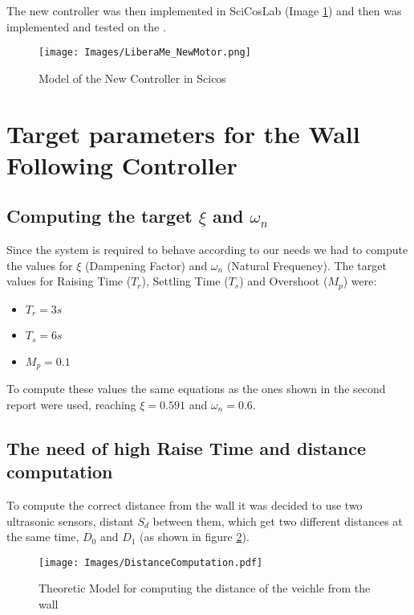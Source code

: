   The new controller was then implemented in SciCosLab (Image
  \ref{img:LiberaMeC}) and then was implemented and tested on the \nxt{}.
  
  \begin{figure}[h!]
    \centering
    \texttt{[image: Images/LiberaMe\_NewMotor.png]}
    \caption{Model of the New Controller in Scicos \label{img:LiberaMeC}}
  \end{figure}


\section{Target parameters for the Wall Following Controller}

  \subsection{Computing the target $\xi$ and $\omega_n$}
  Since the system is required to behave according to our needs we had to
  compute the values for $\xi$ (Dampening Factor) and $\omega_n$
  (Natural Frequency). The target values for Raising Time ($T_r$), Settling
  Time ($T_s$) and Overshoot ($M_p$) were:
  
  \begin{itemize}
    
    \item{} $T_r = 3s$
    \item{} $T_s = 6s$
    \item{} $M_p = 0.1$

  \end{itemize}
  
  To compute these values the same equations as the ones shown in the
  second report were used, reaching $\xi = 0.591$ and $\omega_n = 0.6$.

  \subsection{The need of high Raise Time and distance computation}

    To compute the correct distance from the wall it was decided to use two
    ultrasonic sensors, distant $S_d$ between them, which get two different
    distances at the same time, $D_0$ and $D_1$ (as shown in figure
    \ref{img:DistanceC}).
    
    \begin{figure}[h!]
      \centering
      \texttt{[image: Images/DistanceComputation.pdf]}
      \caption{Theoretic Model for computing the distance of the veichle
        from the wall \label{img:DistanceC}}
    \end{figure}
    
